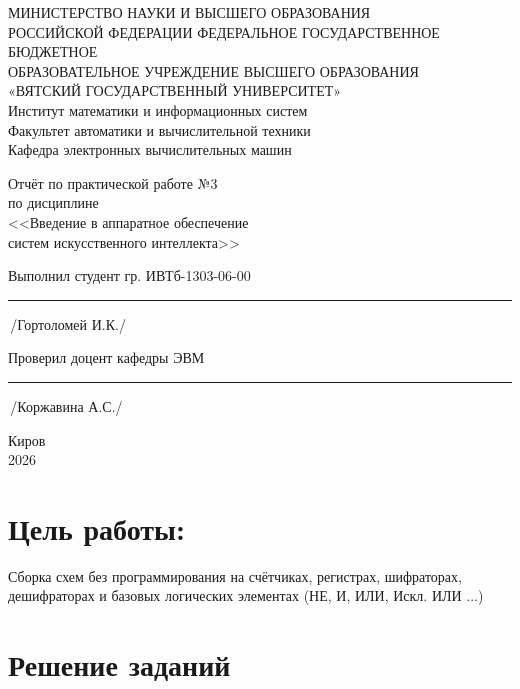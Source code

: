 \documentclass[oneside,a4paper,14pt]{extarticle} %
\begin{document}
	\newpage\thispagestyle{empty}
	\begin{center}
		МИНИСТЕРСТВО НАУКИ И ВЫСШЕГО ОБРАЗОВАНИЯ\\
			РОССИЙСКОЙ ФЕДЕРАЦИИ
			ФЕДЕРАЛЬНОЕ ГОСУДАРСТВЕННОЕ БЮДЖЕТНОЕ\\
			ОБРАЗОВАТЕЛЬНОЕ
			УЧРЕЖДЕНИЕ ВЫСШЕГО ОБРАЗОВАНИЯ\\
			«ВЯТСКИЙ ГОСУДАРСТВЕННЫЙ УНИВЕРСИТЕТ»\\
			Институт математики и информационных систем\\
			Факультет автоматики и вычислительной техники\\
			Кафедра электронных вычислительных машин
	\end{center}
	\vspace{20mm}

	\begin{center}
		Отчёт по практической работе №3\\
		по дисциплине\\
		<<Введение в аппаратное обеспечение \\ систем искусственного интеллекта>>\\
	\end{center}
	\vspace{48mm}

	Выполнил студент гр. ИВТб-1303-06-00 \hspace{10mm} \rule[-0,5mm]{23mm}{0.15mm}\,/Гортоломей И.К./


	Проверил доцент кафедры ЭВМ \hfill  \rule[-0,5mm]{30mm}{0.15mm}\,/Коржавина А.С./

	\vfill
	\begin{center}
		Киров\\
		2026
	\end{center}

	\newpage%

	\section*{Цель работы:} Сборка схем без программирования на счётчиках, регистрах, шифраторах, дешифраторах и базовых логических элементах (НЕ, И, ИЛИ, Искл. ИЛИ ...)

	\section*{Решение заданий}
\end{document}
